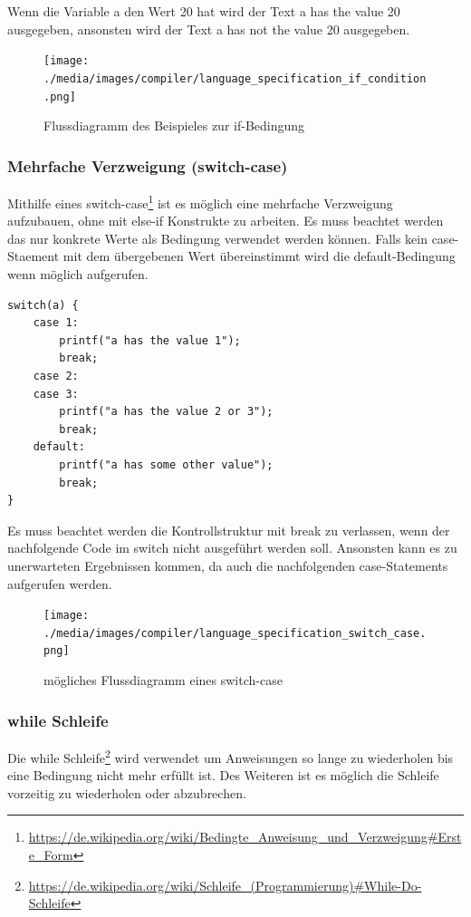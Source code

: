 Wenn die Variable a den Wert 20 hat wird der Text \glqq{}a has the value 20\grqq{} ausgegeben, ansonsten wird der Text \glqq{}a has not the value 20\grqq{} ausgegeben.

\begin{figure}[h]
\centering
\texttt{[image: ./media/images/compiler/language\_specification\_if\_condition.png]}
\caption{Flussdiagramm des Beispieles zur if-Bedingung}
\label{language_specification_if_condition}
\end{figure}

\newpage
\subsubsection{Mehrfache Verzweigung (switch-case)}

Mithilfe eines switch-case\footnote{\url{https://de.wikipedia.org/wiki/Bedingte_Anweisung_und_Verzweigung\#Erste_Form}} ist es m\"oglich eine mehrfache Verzweigung aufzubauen, ohne mit else-if Konstrukte zu arbeiten. Es muss beachtet werden das nur konkrete Werte als Bedingung verwendet werden k\"onnen. Falls kein case-Staement mit dem \"ubergebenen Wert \"ubereinstimmt wird die default-Bedingung wenn m\"oglich aufgerufen.


\begin{lstlisting}[language=CMM]
switch(a) {
	case 1:
		printf("a has the value 1");
		break;
	case 2:
	case 3:
		printf("a has the value 2 or 3");
		break;
	default:
		printf("a has some other value");
		break;
}
\end{lstlisting}

Es muss beachtet werden die Kontrollstruktur mit break zu verlassen, wenn der nachfolgende Code im switch nicht ausgef\"uhrt werden soll. Ansonsten kann es zu unerwarteten Ergebnissen kommen, da auch die nachfolgenden case-Statements aufgerufen werden.

\begin{figure}[h]
\centering
\texttt{[image: ./media/images/compiler/language\_specification\_switch\_case.png]}
\caption{m\"ogliches Flussdiagramm eines switch-case}
\label{language_specification_switch_case}
\end{figure}

\newpage
\subsubsection{while Schleife}

Die while Schleife\footnote{\url{https://de.wikipedia.org/wiki/Schleife_(Programmierung)\#While-Do-Schleife}} wird verwendet um Anweisungen so lange zu wiederholen bis eine Bedingung nicht mehr erf\"ullt ist. Des Weiteren ist es m\"oglich die Schleife vorzeitig zu wiederholen oder abzubrechen. 

